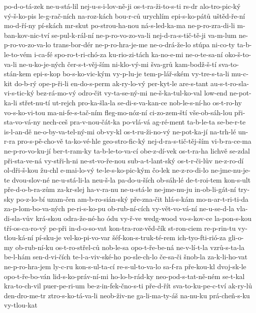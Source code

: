 po-d-o-tá-zek
ne-u-stá-lil
nej-u-s-i-lov-ně-ji
os-t-ra-ži-to-s-ti
rs-dr
alo-tro-pic-ký
vý-š-ko-pis
le-g-rač-ních
na-roz-kách
bou-r-ců
urychlím
epi-s-ko-pátů
uštěd-ře-ní
mo-d-ří-ny
pí-skách
mr-skut
po-strou-ha-nou
ná-s-led-ka-ma
ne-p-ro-zra-di-li
m-ban-kov-nic-tví
se-pul-k-rál-ní
ne-p-ro-vo-zo-va-li
nej-d-ra-s-tič-tě-ji
va-m-lum
ne-p-ro-vo-zo-va-lo
trans-bor-dér
ne-p-ro-hra-je-me
ne-o-drá-že-lo
stúpa
ni-co-ty
ta-b-le-to-vém
i-ca-fé
spo-ro-t-ri-chó-za
ku-rio-zi-tách
ka-no-e-mi
ne-o-te-sa-ní
oko-š-to-va-li
ne-u-ko-je-ných
čer-s-t-věj-ším
ni-klo-vý-mi
šva-grů
kam-bodž-š-tí
sva-to-stán-kem
epi-s-kop
bo-s-ko-vic-kým
vy-p-lu-je
tem-p-lář-ském
vy-tre-s-ta-li
mu-c-kit
do-b-rý
ope-p-ři-li
en-do-s-perm
ak-ry-lo-vý
per-kyt-le
are-s-tant
au-s-t-ro-sla-vi-s-tic-ký
bez-rá-mo-vý
odro-čit
vy-ta-se-ný-mi
ne-š-ka-tul-ko-val
low-end
ne-pot-ka-li
střet-nu-tí
ut-rejch
pro-ka-šla-la
se-di-s-va-kan-ce
nob-le-s-ní-ho
os-t-ro-hy
vo-s-ko-vi-tou
ma-ni-fe-s-tač-ním
fleg-mo-nóz-ní
ci-zo-zem-ští
vše-ob-sáh-lou
při-sta-vo-vá-ny
nech-ceš
pra-v-nou-čát-ka
po-vlá-vá
ag-ré-ment
ta-b-le-ta
se-be-r-te
is-l-an-dě
ne-o-by-va-tel-ný-mi
ob-vy-kl
os-t-ru-ži-no-vý
ne-pot-ka-jí
na-trh-lé
un-r-ra
pro-s-pě-cho-vě
ta-ko-vé-hle
geo-stro-fic-ký
nej-d-ra-s-tič-těj-ším
vi-b-ra-ce-ma
ne-p-ro-vo-ku-jí
ber-t-ram-ky
ta-b-le-to-va-cí
obe-z-dí-vek
os-t-ra-ha
lichvě
se-zdal
při-sta-ve-ná
vy-stři-h-ni
ne-st-vo-ře-nou
sub-a-t-lant-ský
os-t-r-či-lův
ne-z-ro-dí
ol-dři-š-kou
žu-chl
e-mai-lo-vý
te-le-s-ko-pic-kým
čo-lek
ne-z-ro-di-lo
ne-jme-nu-je-te
dvou-slov-né
ne-u-stá-li-la
neu-š-la
pa-do-u-ších
ob-sáh-lé
de-t-roi-tem
kon-s-ult
pře-d-o-b-ra-zům
za-kr-slej
ha-v-ra-nu
ne-u-stá-le
ne-jme-nu-ju
in-ob-li-gát-ní
try-sky
po-z-lo-bí
uzam-čen
am-b-ro-sián-ský
pře-zna-čit
hlá-s-kám
mo-n-ar-t-ri-ti-da
za-p-lom-bo-va-ných
pe-ri-s-ko-pu
ob-rub-ní-cích
vy-vět-vo-vá-ní
ne-u-se-d-la
vla-di-sla-vův
krá-skou
odra-že-né-ho
ódu
vy-ř-ve
wedg-wood
vo-s-kov-ce
la-pon-s-kou
tří-os-ca-ro-vý
pe-při
in-d-o-so-vat
kon-tra-roz-věd-čík
st-ron-ciem
re-p-rin-tu
vy-tlou-ká-ní
pí-sku-je
vel-ko-pi-vo-var
šéf-kon-s-truk-té-rem
ich-tyo-fti-rió-za
gli-o-my
ob-rub-ní-ku
os-t-ro-střel-ců
nob-le-sa
opo-t-ře-be-ná
ne-v-lí-t-la
vzrů-s-ta-la
be-l-hám
sen-d-vi-čích
te-l-a-viv-ské-ho
po-sle-ch-lo
če-sa-či
šnob-la
za-k-li-ho-vat
ne-p-ro-hra-jem
ly-c-ru
kon-s-ul-ta-cí
re-s-ul-to-va-lo
sa-f-ra
pře-kou-kl
dvoj-sk-le
opo-t-ře-bo-ván
lid-s-ko-práv-ní-mi
ho-lo-b-rád-ky
neo-pod-s-tat-ně-ném
se-t-kal
kra-to-ch-vil
puer-pe-ri-um
be-z-in-fek-čno-s-ti
pře-d-řít
sva-to-ku-pe-c-tví
ak-ry-lů
den-dro-me-tr
ztro-s-ko-tá-va-li
neob-živ-ne
ga-li-ma-ty-áš
na-nu-ku
prá-cheň-s-ku
vy-tlou-kat

